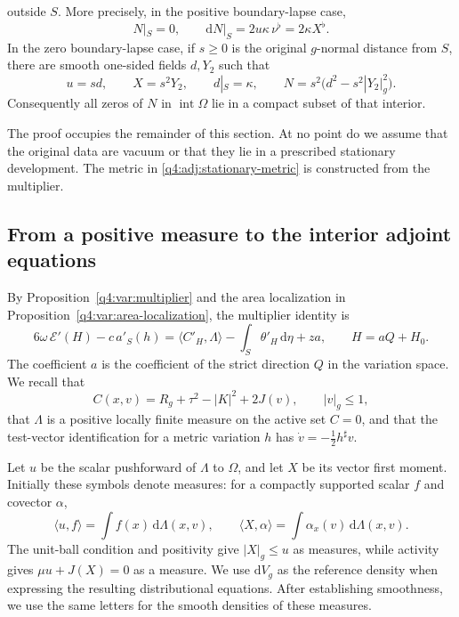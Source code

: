 \begin{theorem}
\begin{enumerate}[label=\textup{(\roman*)}]
outside $S$.  More precisely, in the positive boundary-lapse case,
\begin{equation}
 N|_S=0,\qquad
 \mathrm dN|_S=2u\kappa\,\nu^\flat=2\kappa X^\flat.
 \label{q4:adj:positive-collar}
\end{equation}
In the zero boundary-lapse case, if $s\ge0$ is the original $g$-normal distance
from $S$, there are smooth one-sided fields $d,Y_2$ such that
\begin{equation}
 u=sd,\qquad X=s^2Y_2,\qquad d|_S=\kappa,\qquad
 N=s^2\bigl(d^2-s^2|Y_2|_g^2\bigr).
 \label{q4:adj:zero-collar}
\end{equation}
Consequently all zeros of $N$ in $\operatorname{int}\Omega$ lie in a compact
subset of that interior.
\end{enumerate}
\end{theorem}

The proof occupies the remainder of this section.  At no point do we assume
that the original data are vacuum or that they lie in a prescribed stationary
development.  The metric in \eqref{q4:adj:stationary-metric} is constructed from
the multiplier.

\subsection{From a positive measure to the interior adjoint equations}
\label{q4:adj:measures}

By Proposition~\ref{q4:var:multiplier} and the area localization in
Proposition~\ref{q4:var:area-localization}, the multiplier identity is
\begin{equation}
 6\omega\,\mathcal E'(H)-c\,a'_S(h)
 =\langle C'_H,\Lambda\rangle
   -\int_S\theta'_H\,\mathrm d\eta+za,
 \qquad H=aQ+H_0.
 \label{q4:adj:localized-multiplier}
\end{equation}
The coefficient $a$ is the coefficient of the strict direction $Q$ in the
variation space.  We recall that
\[
 C(x,v)=R_g+\tau^2-|K|^2+2J(v),\qquad |v|_g\le1,
\]
that $\Lambda$ is a positive locally finite measure on the active set $C=0$,
and that the test-vector identification for a metric variation $h$ has
$\dot v=-\tfrac12h^\sharp v$.

Let $u$ be the scalar pushforward of $\Lambda$ to $\Omega$, and let $X$ be its
vector first moment.  Initially these symbols denote measures: for a compactly
supported scalar $f$ and covector $\alpha$,
\[
 \langle u,f\rangle=\int f(x)\,\mathrm d\Lambda(x,v),
 \qquad
 \langle X,\alpha\rangle=\int\alpha_x(v)\,\mathrm d\Lambda(x,v).
\]
The unit-ball condition and positivity give $|X|_g\le u$ as measures, while
activity gives $\mu u+J(X)=0$ as a measure.  We use $\mathrm dV_g$ as the
reference density when expressing the resulting distributional equations.
After establishing smoothness, we use the same letters for the smooth
densities of these measures.


